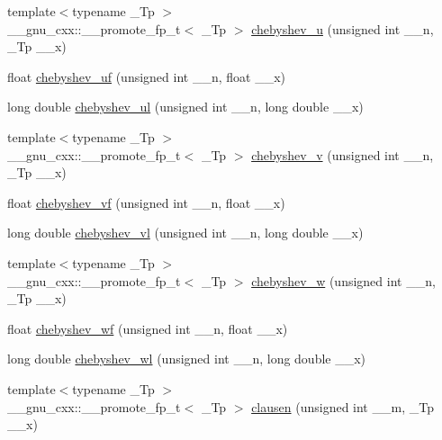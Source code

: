 \begin{DoxyCompactItemize}
{\footnotesize template$<$typename \+\_\+\+Tp $>$ }\\\+\_\+\+\_\+gnu\+\_\+cxx\+::\+\_\+\+\_\+promote\+\_\+fp\+\_\+t$<$ \+\_\+\+Tp $>$ \hyperlink{group__gnu__math__spec__func_gaea7ea830fe6be79ca84fba1bb94691a4}{chebyshev\+\_\+u} (unsigned int \+\_\+\+\_\+n, \+\_\+\+Tp \+\_\+\+\_\+x)
\item 
float \hyperlink{group__gnu__math__spec__func_ga4b28c2a079eae2e9612c9902801ca256}{chebyshev\+\_\+uf} (unsigned int \+\_\+\+\_\+n, float \+\_\+\+\_\+x)
\item 
long double \hyperlink{group__gnu__math__spec__func_ga11ec202d6aacafba1182e962ecf02978}{chebyshev\+\_\+ul} (unsigned int \+\_\+\+\_\+n, long double \+\_\+\+\_\+x)
\item 
{\footnotesize template$<$typename \+\_\+\+Tp $>$ }\\\+\_\+\+\_\+gnu\+\_\+cxx\+::\+\_\+\+\_\+promote\+\_\+fp\+\_\+t$<$ \+\_\+\+Tp $>$ \hyperlink{group__gnu__math__spec__func_ga674e3d97204a74620eb0d408873aefb9}{chebyshev\+\_\+v} (unsigned int \+\_\+\+\_\+n, \+\_\+\+Tp \+\_\+\+\_\+x)
\item 
float \hyperlink{group__gnu__math__spec__func_gaa9635a0da4bdeaa8060ae5cf03c3a12d}{chebyshev\+\_\+vf} (unsigned int \+\_\+\+\_\+n, float \+\_\+\+\_\+x)
\item 
long double \hyperlink{group__gnu__math__spec__func_gae387ee1bfcd52555ad4d690f5888a078}{chebyshev\+\_\+vl} (unsigned int \+\_\+\+\_\+n, long double \+\_\+\+\_\+x)
\item 
{\footnotesize template$<$typename \+\_\+\+Tp $>$ }\\\+\_\+\+\_\+gnu\+\_\+cxx\+::\+\_\+\+\_\+promote\+\_\+fp\+\_\+t$<$ \+\_\+\+Tp $>$ \hyperlink{group__gnu__math__spec__func_ga55ebf3cda76302bc6e0f173fc1c1425e}{chebyshev\+\_\+w} (unsigned int \+\_\+\+\_\+n, \+\_\+\+Tp \+\_\+\+\_\+x)
\item 
float \hyperlink{group__gnu__math__spec__func_gae6d468cee53df584e40afe294127b090}{chebyshev\+\_\+wf} (unsigned int \+\_\+\+\_\+n, float \+\_\+\+\_\+x)
\item 
long double \hyperlink{group__gnu__math__spec__func_ga1297dfd9b9a0f584435de7d83eb9e9c3}{chebyshev\+\_\+wl} (unsigned int \+\_\+\+\_\+n, long double \+\_\+\+\_\+x)
\item 
{\footnotesize template$<$typename \+\_\+\+Tp $>$ }\\\+\_\+\+\_\+gnu\+\_\+cxx\+::\+\_\+\+\_\+promote\+\_\+fp\+\_\+t$<$ \+\_\+\+Tp $>$ \hyperlink{group__gnu__math__spec__func_ga6a1c122722cc68f2347aee002360b2e0}{clausen} (unsigned int \+\_\+\+\_\+m, \+\_\+\+Tp \+\_\+\+\_\+x)

\end{DoxyCompactItemize}
